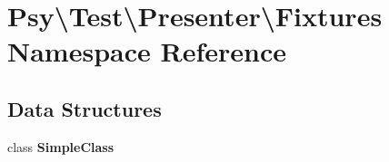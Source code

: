\section{Psy\textbackslash{}Test\textbackslash{}Presenter\textbackslash{}Fixtures Namespace Reference}
\label{namespace_psy_1_1_test_1_1_presenter_1_1_fixtures}
\subsection*{Data Structures}
\begin{DoxyCompactItemize}
\item 
class {\bf Simple\+Class}
\end{DoxyCompactItemize}
